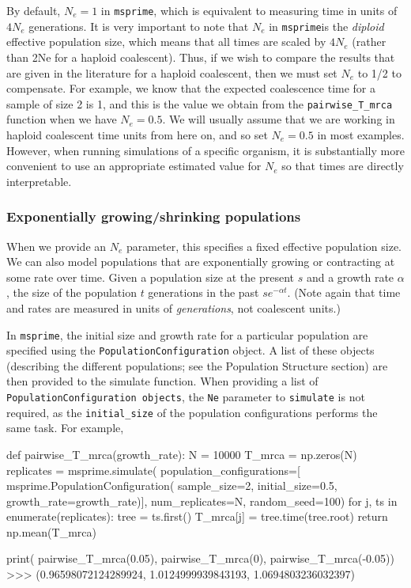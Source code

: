 \documentclass[graybox]{svmult}
\newcommand{\msprime}[0]{\texttt{msprime}}
\begin{document}
By default, \(N_e = 1\) in \msprime, which is equivalent to measuring
time in units of \(4N_e\) generations. It is very important to note that
\(N_e\) in \msprime is the \emph{diploid} effective population size,
which means that all times are scaled by \(4N_e\) (rather than 2Ne for a
haploid coalescent). Thus, if we wish to compare the results that are
given in the literature for a haploid coalescent, then we must set
\(N_e\) to 1/2 to compensate. For example, we know that the expected
coalescence time for a sample of size 2 is 1, and this is the value we
obtain from the \texttt{pairwise\_T\_mrca} function when we have
\(N_e=0.5\). We will usually assume that we are working in haploid
coalescent time units from here on, and so set \(N_e=0.5\) in most
examples. However, when running simulations of a specific organism, it
is substantially more convenient to use an appropriate estimated value
for \(N_e\) so that times are directly interpretable.

\subsubsection{Exponentially growing/shrinking
populations}\label{exponentially-growingshrinking-populations}

When we provide an \(N_e\) parameter, this specifies a fixed effective
population size. We can also model populations that are exponentially
growing or contracting at some rate over time. Given a population size
at the present \(s\) and a growth rate \(\alpha\), the size of the
population \(t\) generations in the past \(s e^{-\alpha t}\). (Note
again that time and rates are measured in units of \emph{generations},
not coalescent units.)

In \msprime, the initial size and growth rate for a particular population
are specified using the \texttt{PopulationConfiguration} object. A list
of these objects (describing the different populations; see the
Population Structure section) are then provided to the simulate
function. When providing a list of
\texttt{PopulationConfiguration\ objects}, the \texttt{Ne} parameter to
\texttt{simulate} is not required, as the \texttt{initial\_size} of the
population configurations performs the same task. For example,

\begin{pythoncode}
def pairwise_T_mrca(growth_rate):
    N = 10000
    T_mrca = np.zeros(N)
    replicates = msprime.simulate(
        population_configurations=[
             msprime.PopulationConfiguration(
                sample_size=2, initial_size=0.5,
                growth_rate=growth_rate)],
        num_replicates=N, random_seed=100)
    for j, ts in enumerate(replicates):
        tree = ts.first()
        T_mrca[j] = tree.time(tree.root)
    return np.mean(T_mrca)

print(
    pairwise_T_mrca(0.05), pairwise_T_mrca(0),
    pairwise_T_mrca(-0.05))
>>> (0.96598072124289924, 1.0124999939843193, 1.0694803236032397)
\end{pythoncode}
\end{document}
